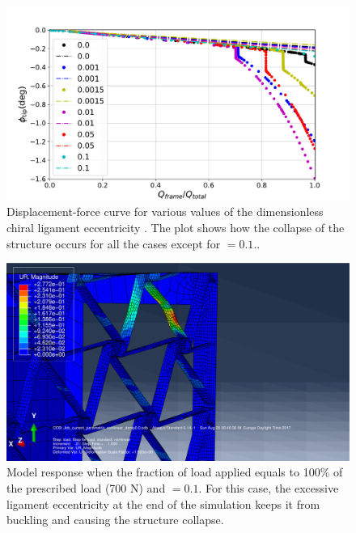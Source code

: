       \begin{figure}[!htpb] %
        \centering
        \includegraphics[width=0.8 \textwidth]{figures/../figures/result-sim/eccen/force_displacement-far}
        \caption[Displacement-force curve for various values of the dimensionless chiral ligament eccentricity]{Displacement-force curve for various values of the dimensionless chiral ligament eccentricity \chie. The plot shows how the collapse of the structure occurs for all the cases except for \chie$= 0.1$..}\label{fig:forceDisplacement-far-e}
      \end{figure}

      \begin{figure}[!htpb] %
        \centering
        \includegraphics[width=0.6 \textwidth]{figures/../figures/result-sim/eccen/0coma1-700N}
        \caption[Model response when the fraction of load applied equals to 100\% of the prescribed load (700 N) and \chie$= 0.1$]{Model response when the fraction of load applied equals to 100\% of the prescribed load (700 N) and \chie$= 0.1$. For this case, the excessive ligament eccentricity at the end of the simulation keeps it from buckling and causing the structure collapse.}
        \label{fig:e0coma1-UR}
      \end{figure}

